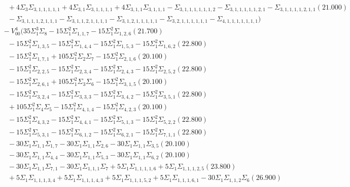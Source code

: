 \documentclass[12pt]{article}
\begin{document}
\begin{landscape}
\begin{align*}
		&\quad\quad +4\Sigma_{3}\Sigma_{3,1,1,1,1,1}+4\Sigma_{3,1}\Sigma_{3,1,1,1,1}+4\Sigma_{3,1,1}\Sigma_{3,1,1,1}-\Sigma_{3,1,1,1,1,1,1,2}-\Sigma_{3,1,1,1,1,1,2,1}-\Sigma_{3,1,1,1,1,2,1,1}(21.000) \\ 
		&\quad\quad -\Sigma_{3,1,1,1,2,1,1,1}-\Sigma_{3,1,1,2,1,1,1,1}-\Sigma_{3,1,2,1,1,1,1,1}-\Sigma_{3,2,1,1,1,1,1,1}-\Sigma_{4,1,1,1,1,1,1,1}) \\
		&\quad\; -V_{00}^{4}(35\Sigma_{1}^{3}\Sigma_{8}-15\Sigma_{1}^{2}\Sigma_{1,1,7}-15\Sigma_{1}^{2}\Sigma_{1,2,6}(21.700) \\ 
		&\quad\quad -15\Sigma_{1}^{2}\Sigma_{1,3,5}-15\Sigma_{1}^{2}\Sigma_{1,4,4}-15\Sigma_{1}^{2}\Sigma_{1,5,3}-15\Sigma_{1}^{2}\Sigma_{1,6,2}(22.800) \\ 
		&\quad\quad -15\Sigma_{1}^{2}\Sigma_{1,7,1}+105\Sigma_{1}^{2}\Sigma_{2}\Sigma_{7}-15\Sigma_{1}^{2}\Sigma_{2,1,6}(20.100) \\ 
		&\quad\quad -15\Sigma_{1}^{2}\Sigma_{2,2,5}-15\Sigma_{1}^{2}\Sigma_{2,3,4}-15\Sigma_{1}^{2}\Sigma_{2,4,3}-15\Sigma_{1}^{2}\Sigma_{2,5,2}(22.800) \\ 
		&\quad\quad -15\Sigma_{1}^{2}\Sigma_{2,6,1}+105\Sigma_{1}^{2}\Sigma_{3}\Sigma_{6}-15\Sigma_{1}^{2}\Sigma_{3,1,5}(20.100) \\ 
		&\quad\quad -15\Sigma_{1}^{2}\Sigma_{3,2,4}-15\Sigma_{1}^{2}\Sigma_{3,3,3}-15\Sigma_{1}^{2}\Sigma_{3,4,2}-15\Sigma_{1}^{2}\Sigma_{3,5,1}(22.800) \\ 
		&\quad\quad +105\Sigma_{1}^{2}\Sigma_{4}\Sigma_{5}-15\Sigma_{1}^{2}\Sigma_{4,1,4}-15\Sigma_{1}^{2}\Sigma_{4,2,3}(20.100) \\ 
		&\quad\quad -15\Sigma_{1}^{2}\Sigma_{4,3,2}-15\Sigma_{1}^{2}\Sigma_{4,4,1}-15\Sigma_{1}^{2}\Sigma_{5,1,3}-15\Sigma_{1}^{2}\Sigma_{5,2,2}(22.800) \\ 
		&\quad\quad -15\Sigma_{1}^{2}\Sigma_{5,3,1}-15\Sigma_{1}^{2}\Sigma_{6,1,2}-15\Sigma_{1}^{2}\Sigma_{6,2,1}-15\Sigma_{1}^{2}\Sigma_{7,1,1}(22.800) \\ 
		&\quad\quad -30\Sigma_{1}\Sigma_{1,1}\Sigma_{1,7}-30\Sigma_{1}\Sigma_{1,1}\Sigma_{2,6}-30\Sigma_{1}\Sigma_{1,1}\Sigma_{3,5}(20.100) \\ 
		&\quad\quad -30\Sigma_{1}\Sigma_{1,1}\Sigma_{4,4}-30\Sigma_{1}\Sigma_{1,1}\Sigma_{5,3}-30\Sigma_{1}\Sigma_{1,1}\Sigma_{6,2}(20.100) \\ 
		&\quad\quad -30\Sigma_{1}\Sigma_{1,1}\Sigma_{7,1}-30\Sigma_{1}\Sigma_{1,1,1}\Sigma_{7}+5\Sigma_{1}\Sigma_{1,1,1,1,6}+5\Sigma_{1}\Sigma_{1,1,1,2,5}(23.800) \\ 
		&\quad\quad +5\Sigma_{1}\Sigma_{1,1,1,3,4}+5\Sigma_{1}\Sigma_{1,1,1,4,3}+5\Sigma_{1}\Sigma_{1,1,1,5,2}+5\Sigma_{1}\Sigma_{1,1,1,6,1}-30\Sigma_{1}\Sigma_{1,1,2}\Sigma_{6}(26.900) \\ 

\end{align*}
\end{landscape}
\end{document}
